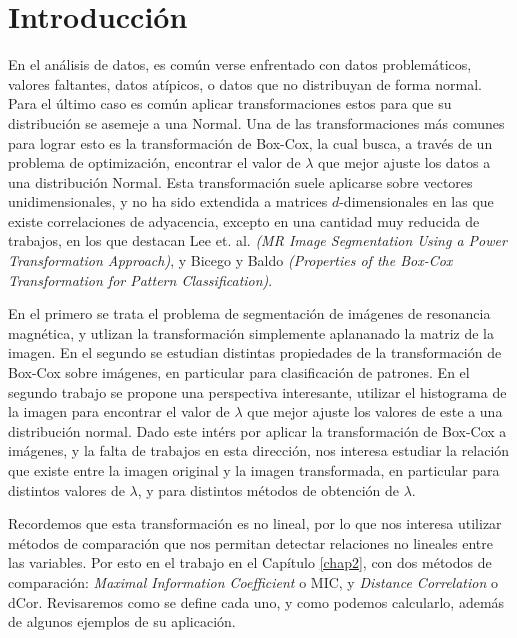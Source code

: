 \chapter{Introducci\'on}\label{chap1}

En el an\'alisis de datos, es com\'un verse enfrentado con datos problem\'aticos, valores faltantes, datos at\'ipicos, o datos que no distribuyan de forma normal. Para el \'ultimo caso es com\'un aplicar transformaciones estos para que su distribuci\'on se asemeje a una Normal. Una de las transformaciones m\'as comunes para lograr esto es la transformaci\'on de Box-Cox, la cual busca, a trav\'es de un problema de optimizaci\'on, encontrar el valor de $\lambda$ que mejor ajuste los datos a una distribuci\'on Normal. Esta transformaci\'on suele aplicarse sobre  vectores unidimensionales, y no ha sido extendida a matrices $d$-dimensionales en las que existe correlaciones de adyacencia, excepto en una cantidad muy reducida de trabajos, en los que destacan Lee et. al. \textit{(MR Image Segmentation Using a Power Transformation Approach)}\cite{lee2009mr}, y Bicego y Baldo \textit{(Properties of the Box-Cox Transformation for Pattern Classification)}\cite{bicego2016}. 

En el primero se trata el problema de segmentaci\'on de im\'agenes de resonancia magn\'etica, y utlizan la transformaci\'on simplemente aplananado la matriz de la imagen. En el segundo se estudian distintas propiedades de la transformaci\'on de Box-Cox sobre im\'agenes, en particular para clasificaci\'on de patrones. En el segundo trabajo se propone una perspectiva interesante, utilizar el histograma de la imagen para encontrar el valor de $\lambda$ que mejor ajuste los valores de este a una distribuci\'on normal. Dado este intérs por aplicar la transformaci\'on de Box-Cox a im\'agenes, y la falta de trabajos en esta direcci\'on, nos interesa estudiar la relaci\'on que existe entre la imagen original y la imagen transformada, en particular para distintos valores de $\lambda$, y para distintos m\'etodos de obtenci\'on de $\lambda$.

Recordemos que esta transformaci\'on es no lineal, por lo que nos interesa utilizar m\'etodos de comparaci\'on que nos permitan detectar relaciones no lineales entre las variables. Por esto en el trabajo en el Cap\'itulo \ref{chap2}, con dos m\'etodos de comparaci\'on: \textit{Maximal Information Coefficient} o MIC, y \textit{Distance Correlation} o dCor. Revisaremos como se define cada uno, y como podemos calcularlo, adem\'as de algunos ejemplos de su aplicaci\'on.

